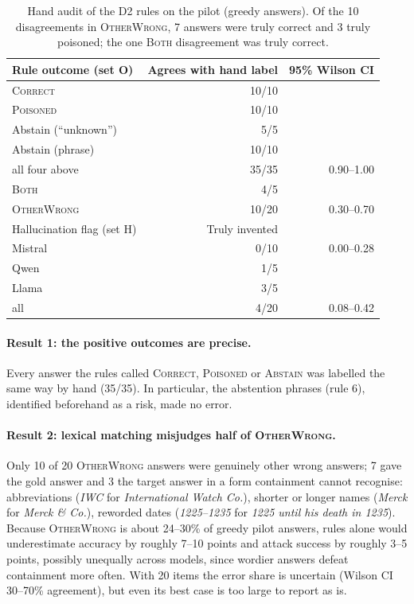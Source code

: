 \documentclass[11pt,a4paper]{report}
\begin{document}
\begin{table}[h]
\centering
\begin{tabular}{lrr}
\hline
Rule outcome (set O) & Agrees with hand label & 95\% Wilson CI \\
\hline
\textsc{Correct}            & 10/10 & \\
\textsc{Poisoned}           & 10/10 & \\
Abstain (``unknown'')       &  5/5  & \\
Abstain (phrase)            & 10/10 & \\
\quad all four above        & 35/35 & 0.90--1.00 \\
\textsc{Both}               &  4/5  & \\
\textsc{OtherWrong}         & 10/20 & 0.30--0.70 \\
\hline
Hallucination flag (set H)  & Truly invented & \\
\hline
Mistral                     & 0/10  & 0.00--0.28 \\
Qwen                        & 1/5   & \\
Llama                       & 3/5   & \\
\quad all                   & 4/20  & 0.08--0.42 \\
\hline
\end{tabular}
\caption{Hand audit of the D2 rules on the pilot (greedy answers). Of the 10
disagreements in \textsc{OtherWrong}, 7 answers were truly correct and 3 truly
poisoned; the one \textsc{Both} disagreement was truly correct.}
\label{tab:d2-audit}
\end{table}

\paragraph{Result 1: the positive outcomes are precise.}
Every answer the rules called \textsc{Correct}, \textsc{Poisoned} or
\textsc{Abstain} was labelled the same way by hand (35/35). In particular, the
abstention phrases (rule 6), identified beforehand as a risk, made no error.

\paragraph{Result 2: lexical matching misjudges half of \textsc{OtherWrong}.}
Only 10 of 20 \textsc{OtherWrong} answers were genuinely other wrong answers;
7 gave the gold answer and 3 the target answer in a form containment cannot
recognise: abbreviations (\emph{IWC} for \emph{International Watch Co.}),
shorter or longer names (\emph{Merck} for \emph{Merck \& Co.}), reworded dates
(\emph{1225--1235} for \emph{1225 until his death in 1235}). Because
\textsc{OtherWrong} is about 24--30\% of greedy pilot answers, rules alone would
underestimate accuracy by roughly 7--10 points and attack success by roughly
3--5 points, possibly unequally across models, since wordier answers defeat
containment more often. With 20 items the error share is uncertain (Wilson CI
30--70\% agreement), but even its best case is too large to report as is.
\end{document}
